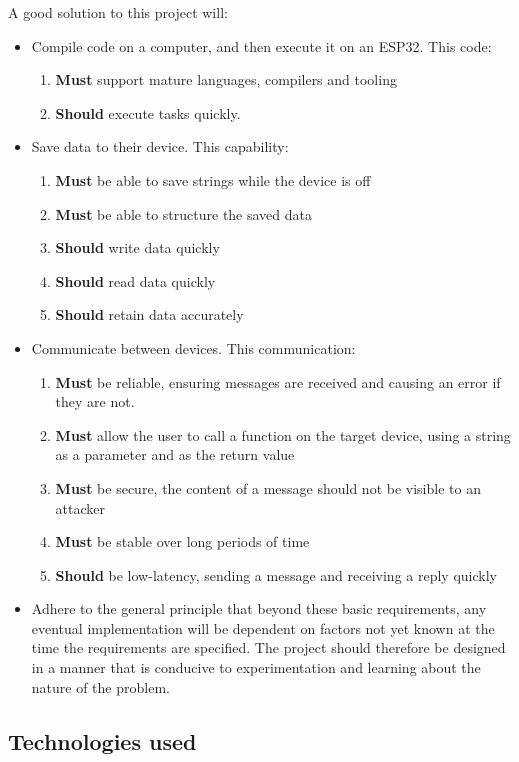 \documentclass{article}
\begin{document}
A good solution to this project will:
\begin{itemize}
\item Compile code on a computer, and then execute it on an ESP32. This code:
\begin{enumerate}
  \item \textbf{Must} support mature languages, compilers and tooling
  \item \textbf{Should} execute tasks quickly.
\end{enumerate}
\item Save data to their device. This capability:
\begin{enumerate}
  \item \textbf{Must} be able to save strings while the device is off
  \item \textbf{Must} be able to structure the saved data
  \item \textbf{Should} write data quickly
  \item \textbf{Should} read data quickly
  \item \textbf{Should} retain data accurately
\end{enumerate}
\item Communicate between devices. This communication:
\begin{enumerate}
  \item \textbf{Must} be reliable, ensuring messages are received and causing an error if they are not.
  \item \textbf{Must} allow the user to call a function on the target device, using a string as a parameter and as the return value
  \item \textbf{Must} be secure, the content of a message should not be visible to an attacker
  \item \textbf{Must} be stable over long periods of time
  \item \textbf{Should} be low-latency, sending a message and receiving a reply quickly
\end{enumerate}
\item Adhere to the general principle that beyond these basic requirements, any eventual implementation will be dependent on factors not yet known at the time the requirements are specified. The project should therefore be designed in a manner that is conducive to experimentation and learning about the nature of the problem.
\end{itemize}
\subsection{Technologies used}
\end{document}

